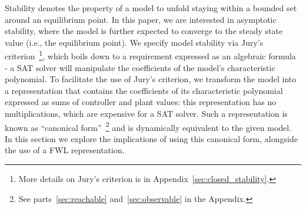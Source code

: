 \documentclass[sigconf]{llncs}
\begin{document}
Stability denotes the property of a model to unfold staying within a bounded set around an equilibrium point. 
In this paper, we are interested in asymptotic stability, where the model is further expected to converge to the steady state value (i.e., the equilibrium point).   
%
We specify model stability via Jury's criterion~\cite{fadali}\footnote{More details on Jury's criterion is in Appendix~\ref{sec:closed_stability}.}, 
which boils down to a requirement expressed as an algebraic formula - a SAT solver will manipulate the coefficients of the model's characteristic polynomial. 
%
To facilitate the use of Jury's criterion, we transform the model into
a representation that contains the coefficients of its characteristic
polynomial expressed as sums of controller and plant values: this
representation has no multiplications, which are expensive for a SAT
solver.
%
Such a representation is known as 
``canonical form''~\cite{Astrom08}\footnote{See parts~\ref{sec:reachable} and~\ref{sec:observable} in the Appendix.} 
and is dynamically equivalent to the given model.  
In this section we explore the implications of using this canonical form, 
alongside the use of a FWL representation. 

\medskip
\end{document}
